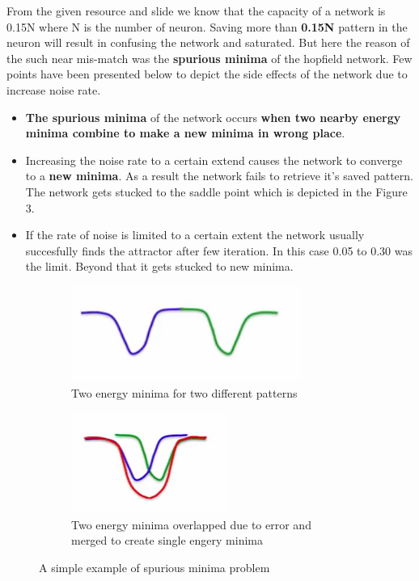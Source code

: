 \documentclass{article}
\begin{document}
From the given resource and slide we know that the capacity of a network is
0.15N where N is the number of neuron. Saving more than \textbf{0.15N} pattern in the 
neuron will result in confusing the network and saturated. But here the reason
of the such near mis-match was  the \textbf{spurious minima} of the hopfield
network. Few points have been presented below to depict the side effects of the
network due to increase noise rate.
\begin{itemize}
  \item \textbf{The spurious minima} of the network occurs \textbf{when two 
      nearby energy minima combine to make a new minima in wrong place}. 
  \item Increasing the noise rate to a certain extend causes the network
    to converge to a \textbf{new minima}. As a result the network fails to
    retrieve it's saved pattern. The network gets stucked to the saddle 
    point which is depicted in the Figure 3.
  \item If the rate of noise is limited to a certain extent the network usually
    succesfully finds the attractor after few iteration. In this case 0.05 to
    0.30 was the limit. Beyond that it gets stucked to new minima. 
\end{itemize}


\begin{figure}
\centering
\begin{subfigure}{.5\textwidth}
  \centering
  \includegraphics[width=.4\linewidth]{sp.png}
  \caption{Two energy minima for two different patterns}
  \label{fig:sp}
\end{subfigure}%
\begin{subfigure}{.5\textwidth}
  \centering
  \includegraphics[width=.4\linewidth]{sp2.png}
  \caption{Two energy minima overlapped due to error and merged to create
  single engery minima}
  \label{fig:six3}
\end{subfigure}
\caption{A simple example of spurious minima problem}
\label{fig:three}
\end{figure}
\end{document}
